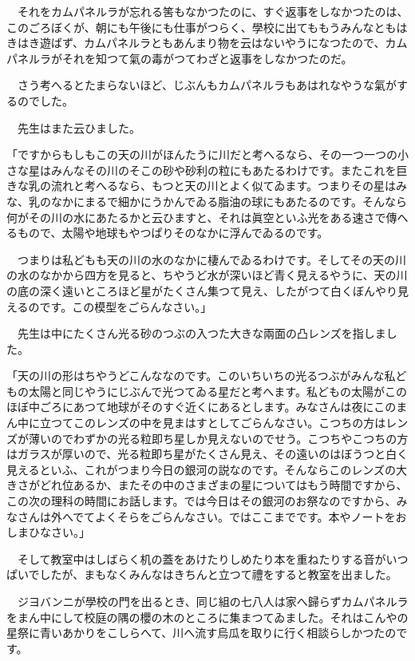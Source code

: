 \documentclass[tate,paper=b6j,jafontsize=9pt]{jlreq}
\begin{document}
　それをカムパネルラが忘れる筈もなかつたのに、すぐ返事をしなかつたのは、このごろぼくが、朝にも午後にも仕事がつらく、學校に出てももうみんなともはきはき遊ばず、カムパネルラともあんまり物を云はないやうになつたので、カムパネルラがそれを知つて氣の毒がつてわざと返事をしなかつたのだ。

　さう考へるとたまらないほど、じぶんもカムパネルラもあはれなやうな氣がするのでした。

　先生はまた云ひました。

「ですからもしもこの天の川がほんたうに川だと考へるなら、その一つ一つの小さな星はみんなその川のそこの砂や砂利の粒にもあたるわけです。またこれを巨きな乳の流れと考へるなら、もつと天の川とよく似てゐます。つまりその星はみな、乳のなかにまるで細かにうかんでゐる脂油の球にもあたるのです。そんなら何がその川の水にあたるかと云ひますと、それは眞空といふ光をある速さで傳へるもので、太陽や地球もやつぱりそのなかに浮んでゐるのです。

　つまりは私どもも天の川の水のなかに棲んでゐるわけです。そしてその天の川の水のなかから四方を見ると、ちやうど水が深いほど青く見えるやうに、天の川の底の深く遠いところほど星がたくさん集つて見え、したがつて白くぼんやり見えるのです。この模型をごらんなさい。」

　先生は中にたくさん光る砂のつぶの入つた大きな兩面の凸レンズを指しました。

「天の川の形はちやうどこんななのです。このいちいちの光るつぶがみんな私どもの太陽と同じやうにじぶんで光つてゐる星だと考へます。私どもの太陽がこのほぼ中ごろにあつて地球がそのすぐ近くにあるとします。みなさんは夜にこのまん中に立つてこのレンズの中を見まはすとしてごらんなさい。こつちの方はレンズが薄いのでわずかの光る粒即ち星しか見えないのでせう。こつちやこつちの方はガラスが厚いので、光る粒即ち星がたくさん見え、その遠いのはぼうつと白く見えるといふ、これがつまり今日の銀河の説なのです。そんならこのレンズの大きさがどれ位あるか、またその中のさまざまの星についてはもう時間ですから、この次の理科の時間にお話します。では今日はその銀河のお祭なのですから、みなさんは外へでてよくそらをごらんなさい。ではここまでです。本やノートをおしまひなさい。」

　そして教室中はしばらく机の蓋をあけたりしめたり本を重ねたりする音がいつぱいでしたが、まもなくみんなはきちんと立つて禮をすると教室を出ました。



　ジヨバンニが學校の門を出るとき、同じ組の七八人は家へ歸らずカムパネルラをまん中にして校庭の隅の櫻の木のところに集まつてゐました。それはこんやの星祭に青いあかりをこしらへて、川へ流す烏瓜を取りに行く相談らしかつたのです。
\end{document}
